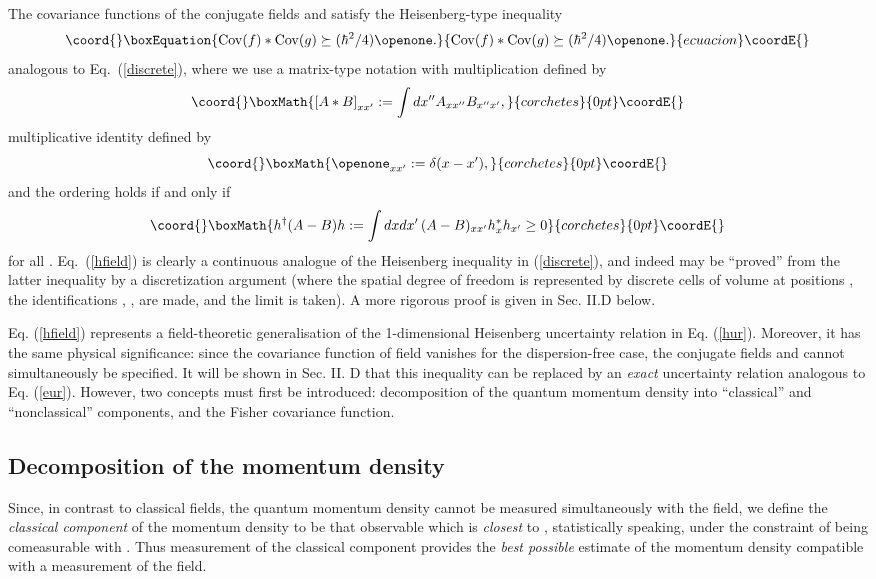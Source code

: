 \documentclass[a4paper,preprint, showpacs, aps, draft]{revtex4}
\begin{document}
{The covariance functions of the conjugate fields \coordHE{} and \coordHE{} satisfy the 
Heisenberg-type inequality 
\begin{equation}\coord{}\boxEquation{ \label{hfield}
{\rm Cov}(f) \ast {\rm Cov}(g) \succeq (\hbar^2/4)\openone .
}{ {\rm Cov}(f) \ast {\rm Cov}(g) \succeq (\hbar^2/4)\openone .
}{ecuacion}\coordE{}\end{equation}
analogous to Eq.~(\ref{discrete}), 
where we use a matrix-type notation with multiplication \coordHE{}
defined
by
\[\coord{}\boxMath{
\left[ A\ast B\right]_{x x'} := \int dx'' A_{x x''}B_{x'' x'} ,
}{corchetes}{0pt}\coordE{}\]
multiplicative identity \myHighlight{$\openone$}\coordHE{} defined by
\[\coord{}\boxMath{
\openone_{xx'} := \delta(x-x') , }{corchetes}{0pt}\coordE{}\]
and the ordering \coordHE{} holds if and only if
\[\coord{}\boxMath{
h^\dagger (A-B) h := \int dxdx'\,(A-B)_{xx'}h^*_{x}h_{x'} \geq 0 }{corchetes}{0pt}\coordE{}\]
for all \coordHE{}. 
Eq.~(\ref{hfield}) is clearly a continuous analogue of the Heisenberg
inequality in (\ref{discrete}), and indeed 
may be ``proved'' from the latter inequality by
a discretization argument (where the spatial degree of freedom is
represented by discrete cells of volume \myHighlight{$\epsilon$}\coordHE{} at positions \coordHE{}, 
the identifications \coordHE{}, \coordHE{},
\coordHE{} are made, and
the limit \coordHE{} is taken).  A more rigorous proof is
given in Sec. II.D below. 

Eq. (\ref{hfield}) represents a field-theoretic
generalisation of the 1-dimensional Heisenberg uncertainty relation in
Eq. (\ref{hur}).  Moreover, 
it has the same physical significance: since
the covariance function of field \coordHE{} vanishes for the
dispersion-free case, the conjugate fields 
\coordHE{} and \coordHE{} cannot simultaneously be specified. It will be shown in Sec.
II. D that this inequality can be replaced by an {\it exact }uncertainty
relation analogous to Eq. (\ref{eur}).  However, two concepts must first
be introduced:  decomposition of the quantum momentum density into ``classical''
and ``nonclassical'' components, and the Fisher covariance function. 

\subsection{Decomposition of the momentum density}
Since, in contrast to classical fields, the quantum momentum density
cannot be measured simultaneously with the field, we define the {\it
classical component} of the momentum density to be that observable which
is {\it closest} to \coordHE{}, statistically speaking, 
under the constraint of being
comeasurable with \coordHE{}.  Thus measurement of the classical component
provides the {\it best possible} estimate of the momentum density 
compatible with a measurement of the field.

}
\end{document}
